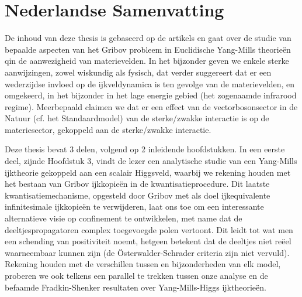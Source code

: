 

\chapter*{Nederlandse Samenvatting}



De inhoud van deze thesis is gebaseerd op de artikels
\cite{Capri:2013oja,Capri:2013gha,Capri:2012ah,Capri:2012cr,Capri:2014jqa,Canfora:2015yia,Capri:2015mna}
en gaat over de studie van bepaalde aspecten van het Gribov probleem in Euclidische Yang-Mills
theorie\"en qin de aanwezigheid van materievelden. In het bijzonder geven we enkele sterke
aanwijzingen, zowel wiskundig als fysisch, dat verder suggereert dat er een wederzijdse invloed
op de ijkveldynamica is ten gevolge van de materievelden, en omgekeerd, in het bijzonder in het
lage energie gebied (het zogenaamde infrarood regime). Meerbepaald claimen we dat er een effect
van de vectorbosonsector in de Natuur (cf. het Standaardmodel)  van de sterke/zwakke interactie
is op de materiesector, gekoppeld aan de sterke/zwakke interactie.

 

Deze thesis bevat 3 delen, volgend op 2 inleidende hoofdstukken. In een eerste deel, zijnde
Hoofdstuk 3, vindt de lezer een analytische studie van een Yang-Mills ijktheorie gekoppeld aan
een scalair Higgsveld, waarbij we rekening houden met het bestaan van Gribov ijkkopie\"en in de
kwantisatieprocedure. Dit laatste kwantisatiemechanisme, opgesteld door Gribov met als doel
ijkequivalente infinitesimale ijkkopie\"en te verwijderen, laat ons toe om een interessante
alternatieve visie op confinement te ontwikkelen, met name dat de deeltjespropagatoren complex
toegevoegde polen vertoont. Dit leidt tot wat men een schending van positiviteit noemt, hetgeen
betekent dat de deeltjes niet re\"eel waarneembaar kunnen zijn (de \"Osterwalder-Schrader
criteria zijn niet vervuld).
Rekening houden met de verschillen tussen en bijzonderheden van elk model, proberen we ook
telkens een parallel te trekken tussen onze analyse en de befaamde Fradkin-Shenker resultaten
over Yang-Mills-Higgs ijktheorie\"en.

 

